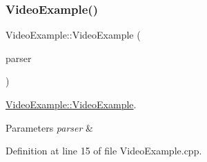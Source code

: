 \subsubsection{\texorpdfstring{Video\+Example()}{VideoExample()}}
{\footnotesize\ttfamily Video\+Example\+::\+Video\+Example (\begin{DoxyParamCaption}\item[{const cv\+::\+Command\+Line\+Parser \&}]{parser }\end{DoxyParamCaption})}



\mbox{\hyperlink{class_video_example_aedc40ab44835e8ad1cf731b7709cd4ac}{Video\+Example\+::\+Video\+Example}}. 


\begin{DoxyParams}{Parameters}
{\em parser} & \\
\hline
\end{DoxyParams}


Definition at line 15 of file Video\+Example.\+cpp.


